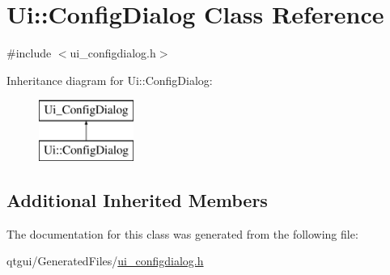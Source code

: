 \hypertarget{class_ui_1_1_config_dialog}{}\section{Ui\+::Config\+Dialog Class Reference}
\label{class_ui_1_1_config_dialog}


{\ttfamily \#include $<$ui\+\_\+configdialog.\+h$>$}

Inheritance diagram for Ui\+::Config\+Dialog\+:\begin{figure}[H]
\begin{center}
\leavevmode
\includegraphics[height=2.000000cm]{df/d7b/class_ui_1_1_config_dialog}
\end{center}
\end{figure}
\subsection*{Additional Inherited Members}


The documentation for this class was generated from the following file\+:\begin{DoxyCompactItemize}
\item 
qtgui/\+Generated\+Files/\mbox{\hyperlink{ui__configdialog_8h}{ui\+\_\+configdialog.\+h}}\end{DoxyCompactItemize}
